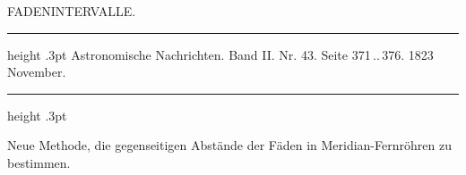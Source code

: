 \par\bigskip
{}
\hypertarget{native-450-fadenintervalle}{}
\begin{center}
{\large FADENINTERVALLE.}
\end{center}

\begin{center}\parbox{.86\linewidth}{\centering\small
\hrule height .3pt\relax\vspace{2.5pt}
Astronomische Nachrichten. Band II. Nr. 43. Seite 371\,..\,376. 1823 November.\par
\vspace{2.5pt}\hrule height .3pt\relax
}\end{center}

\begin{center}
Neue Methode, die gegenseitigen Abstände der Fäden in Meridian-Fernröhren zu bestimmen.
\end{center}

